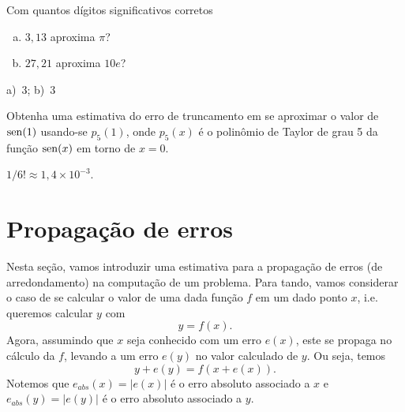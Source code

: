 \begin{exer}\label{exer:dig_corr}
  Com quantos dígitos significativos corretos
  \begin{enumerate}[a)]
  \item $3,13$ aproxima $\pi$?
  \item $27,21$ aproxima $10e$?
  \end{enumerate}
\end{exer}
\begin{resp}
  a)~$3$; b)~$3$
\end{resp}


\begin{exer}
  Obtenha uma estimativa do erro de truncamento em se aproximar o valor de $\operatorname{sen}(1)$ usando-se $p_5(1)$, onde $p_5(x)$ é o polinômio de Taylor de grau 5 da função $\operatorname{sen}(x)$ em torno de $x=0$.
\end{exer}
\begin{resp}
  $1/6! \approx 1,4\times 10^{-3}$.
\end{resp}

\section{Propagação de erros}\label{cap_aritm_sec_properros}

Nesta seção, vamos introduzir uma estimativa para a propagação de erros (de arredondamento) na computação de um problema. Para tando, vamos considerar o caso de se calcular o valor de uma dada função $f$ em um dado ponto $x$, i.e. queremos calcular $y$ com
\begin{equation}\label{eq:properros_aux1}
  y = f(x).
\end{equation}
Agora, assumindo que $x$ seja conhecido com um erro $e(x)$, este se propaga no cálculo da $f$, levando a um erro $e(y)$ no valor calculado de $y$. Ou seja, temos
\begin{equation}\label{eq:properros_aux2}
  y + e(y) = f(x+e(x)).
\end{equation}
Notemos que $e_{abs}(x) = |e(x)|$ é o erro absoluto associado a $x$ e $e_{abs}(y) = |e(y)|$ é o erro absoluto associado a $y$.

